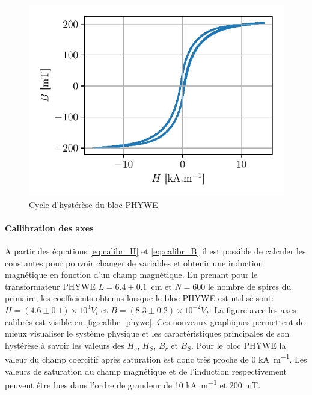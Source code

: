 \begin{minipage}{\linewidth}
    \begin{figure}
        \includegraphics[width=\linewidth]{figures/G1-phywe-avec-bloc_chang.pdf}
        \caption{Cycle d'hystérèse du bloc PHYWE}
        \label{fig:calibr_phywe}
    \end{figure}
    
    \paragraph{Callibration des axes}
    A partir des équations \autoref{eq:calibr_H} et \autoref{eq:calibr_B} il est possible de calculer les constantes pour pouvoir changer de variables et obtenir une induction magnétique en fonction d'un champ magnétique. En prenant pour le transformateur PHYWE \mbox{\(L = 6.4 \pm 0.1\) \si{\centi \meter}} et \mbox{\(N = 600\)} le nombre de spires du primaire, les coefficients obtenus lorsque le bloc PHYWE est utilisé sont: \mbox{\(H = (4.6\pm0.1)\times10^3 V_i\)} et \mbox{\(B = (8.3\pm0.2)\times10^{-2} V_f\)}. La figure avec les axes calibrés est visible en \autoref{fig:calibr_phywe}.
    Ces nouveaux graphiques permettent de mieux visualiser le système physique et les caractéristiques principales de son hystérèse à savoir les valeurs des \(H_c\), \(H_S\), \(B_r\) et \(B_S\). Pour le bloc PHYWE la valeur du champ coercitif après saturation est donc très proche de 0 \si{\kilo\ampere\per\meter}. Les valeurs de saturation  du champ magnétique et de l'induction respectivement peuvent être lues dans l'ordre de grandeur de 10 \si{\kilo\ampere\per\meter} et 200 \si{\milli\tesla}.
\end{minipage}

